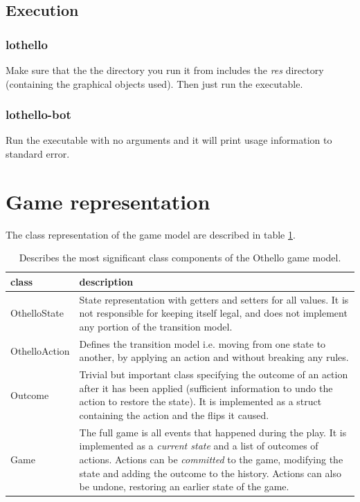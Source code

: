 \documentclass[a4paper,11pt]{article}
\begin{document}
\subsection{Execution}
\subsubsection{lothello}
Make sure that the the directory you run it from includes the \textit{res} directory (containing the graphical objects used). Then just run the executable.

\subsubsection{lothello-bot}
Run the executable with no arguments and it will print usage information to standard error.

\section{Game representation}
The class representation of the game model are described in table \ref{tab:model}.

\begin{table}

\centering
\begin{tabular}{|l|p{12 cm}|}
\hline
\textbf{class} & \textbf{description}
\\ \hline
OthelloState & State representation with getters and setters for all values. It is not responsible for keeping itself legal, and does not implement any portion of the transition model.
\\ \hline
OthelloAction & Defines the transition model i.e. moving from one state to another, by applying an action and without breaking any rules.
\\ \hline
Outcome & Trivial but important class specifying the outcome of an action after it has been applied (sufficient information to undo the action to restore the state). It is implemented as a struct containing the action and the flips it caused.
\\ \hline
Game & The full game is all events that happened during the play. It is implemented as a \textit{current state} and a list of outcomes of actions. Actions can be \textit{committed} to the game, modifying the state and adding the outcome to the history. Actions can also be undone, restoring an earlier state of the game.
\\ \hline
\end{tabular}

\caption{Describes the most significant class components of the Othello game model.} \label{tab:model}

\end{table}
\end{document}
